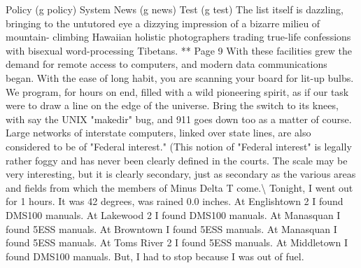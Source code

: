 \documentclass{article}
\begin{document}
Policy    (g policy) System News      (g news)   Test     (g test)     The list itself is dazzling, bringing to the untutored eye a dizzying impression of a bizarre milieu of mountain{-} climbing Hawaiian holistic photographers trading true{-}life confessions with bisexual word{-}processing Tibetans. ** Page 9  With these facilities grew the demand for remote access to computers, and modern data communications began. With the ease of long habit, you are scanning your board for lit{-}up bulbs. We program, for hours on end, filled with a wild pioneering spirit, as if our task were to draw a line on the edge of the universe. Bring the switch to its knees, with say the UNIX "makedir" bug, and 911 goes down too as a matter of course. Large networks of interstate computers, linked over state lines, are also considered to be of "Federal interest." (This notion of "Federal interest" is legally rather foggy and has never been clearly defined in the courts. The scale may be very interesting, but it is clearly secondary, just as secondary as the various areas and fields from which the members of Minus Delta T come.\textbackslash{} Tonight, I went out for 1 hours. It was 42 degrees, was rained 0.0 inches. At Englishtown 2 I found DMS100 manuals. At Lakewood 2 I found DMS100 manuals. At Manasquan I found 5ESS manuals. At Browntown I found 5ESS manuals. At Manasquan I found 5ESS manuals. At Toms River 2 I found 5ESS manuals. At Middletown I found DMS100 manuals. But, I had to stop because I was out of fuel.
\end{document}
